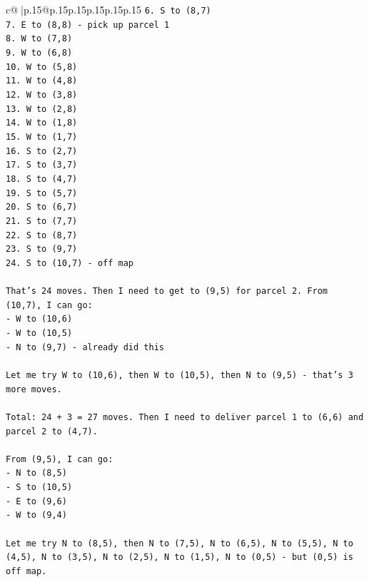 \documentclass{article}
\begin{document}
{\begin{supertabular}{c@{$\;$}|p{.15\linewidth}@{}p{.15\linewidth}p{.15\linewidth}p{.15\linewidth}p{.15\linewidth}p{.15\linewidth}}
{{{\texttt{6. S to (8,7)} \\
\texttt{7. E to (8,8) {-} pick up parcel 1} \\
\texttt{8. W to (7,8)} \\
\texttt{9. W to (6,8)} \\
\texttt{10. W to (5,8)} \\
\texttt{11. W to (4,8)} \\
\texttt{12. W to (3,8)} \\
\texttt{13. W to (2,8)} \\
\texttt{14. W to (1,8)} \\
\texttt{15. W to (1,7)} \\
\texttt{16. S to (2,7)} \\
\texttt{17. S to (3,7)} \\
\texttt{18. S to (4,7)} \\
\texttt{19. S to (5,7)} \\
\texttt{20. S to (6,7)} \\
\texttt{21. S to (7,7)} \\
\texttt{22. S to (8,7)} \\
\texttt{23. S to (9,7)} \\
\texttt{24. S to (10,7) {-} off map} \\
\\ 
\texttt{That's 24 moves. Then I need to get to (9,5) for parcel 2. From (10,7), I can go:} \\
\texttt{{-} W to (10,6)} \\
\texttt{{-} W to (10,5)} \\
\texttt{{-} N to (9,7) {-} already did this} \\
\\ 
\texttt{Let me try W to (10,6), then W to (10,5), then N to (9,5) {-} that's 3 more moves.} \\
\\ 
\texttt{Total: 24 + 3 = 27 moves. Then I need to deliver parcel 1 to (6,6) and parcel 2 to (4,7).} \\
\\ 
\texttt{From (9,5), I can go:} \\
\texttt{{-} N to (8,5)} \\
\texttt{{-} S to (10,5)} \\
\texttt{{-} E to (9,6)} \\
\texttt{{-} W to (9,4)} \\
\\ 
\texttt{Let me try N to (8,5), then N to (7,5), N to (6,5), N to (5,5), N to (4,5), N to (3,5), N to (2,5), N to (1,5), N to (0,5) {-} but (0,5) is off map.} \\
}}}
\end{supertabular}}
\end{document}
